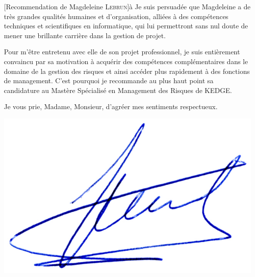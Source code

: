 \documentclass[a4paper,10pt]{article}
\begin{document}
\begin{letter}[Recommendation de Magdeleine \textsc{Lebrun}]{à}
Je suis persuadée que Magdeleine a de très grandes qualités humaines et
d'organisation, alliées à des compétences techniques et scientifiques en
informatique, qui lui permettront sans nul doute de mener une brillante
carrière dans la gestion de projet.

Pour m'être entretenu  avec elle de son projet professionnel,  je suis entièrement
convaincu par  sa motivation  à acquérir des  compétences complémentaires dans
le domaine de la gestion des risques et ainsi accéder plus rapidement à des
fonctions de management. C'est pourquoi je recommande au plus haut point sa
candidature au Mastère Spécialisé en Management des Risques de KEDGE.


Je vous prie, Madame, Monsieur, d'agréer mes sentiments respectueux.

\end{letter}
\begin{flushright}
\includegraphics[width=.2\textwidth]{signgenaud.jpg}
\end{flushright}
\end{document}
